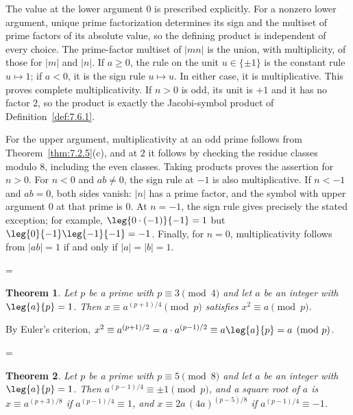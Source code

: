 \documentclass[11pt]{article}
\makeatletter
\theoremstyle{ntstyle}
\newtheorem{theorem}{Theorem}[subsection]
\let\nt@closedisplay\]
\def\nt@guardedclose{\@ifnextchar\par{\nt@closeafterpar}{\@ifnextchar\end{\postdisplaypenalty\@M\nt@closedisplay}{\nt@closedisplay}}}
\def\nt@closeafterpar\par{\@ifnextchar\par{\nt@closeafterpar}{\@ifnextchar\end{\postdisplaypenalty\@M\nt@closedisplay\par}{\nt@closedisplay\par}}}
\renewenvironment{proof}[1][\proofname]{\par
  \pushQED{\qed}\normalfont\topsep\medskipamount\edef\nt@afterproof{\@endparpenalty=\the\@endparpenalty\relax}\@beginparpenalty\@M\@endparpenalty\@M\let\]\nt@guardedclose\trivlist\item[]\textit{#1\@addpunct{.}} \ignorespaces}{\ifvmode\addpenalty\@M\fi\popQED\nt@afterproof\endtrivlist\@endpefalse}
\makeatother
\begin{document}
\begin{proof} The value at the lower argument $0$ is prescribed
	explicitly. For a nonzero lower argument, unique prime factorization
	determines its sign and the multiset of prime factors of its absolute
	value, so the defining product is independent of every choice. The
	prime-factor multiset of $|mn|$ is the union, with multiplicity, of
	those for $|m|$ and $|n|$. If $a\ge0$, the rule on the unit
	$u\in\{\pm1\}$ is the constant rule $u\mapsto1$; if $a<0$, it is
	the sign rule $u\mapsto u$. In either case, it is multiplicative. This proves complete
	multiplicativity. If $n>0$ is odd, its unit is $+1$ and it has no factor
	$2$, so the product is exactly the Jacobi-symbol product of Definition~\ref{def:7.6.1}.

	For the upper argument, multiplicativity at an odd prime follows from
	Theorem~\ref{thm:7.2.5}(c), and at $2$ it follows by checking the
	residue classes modulo $8$, including the even classes. Taking products
	proves the assertion for $n>0$. For $n<0$ and $ab\ne0$, the sign rule
	at $-1$ is also multiplicative. If $n<-1$ and $ab=0$, both sides vanish:
	$|n|$ has a prime factor, and the symbol with upper argument $0$ at
	that prime is $0$. At $n=-1$, the sign rule gives precisely the stated
	exception; for example, $\leg{0\cdot(-1)}{-1}=1$ but
	$\leg{0}{-1}\leg{-1}{-1}=-1$. Finally, for $n=0$, multiplicativity
	follows from $|ab|=1$ if and only if $|a|=|b|=1$.

\end{proof}
\begin{theorem}\label{thm:7.6.5} Let $p$ be a prime with $p \equiv 3
		\pmod{4}$ and let $a$ be an integer with $\leg{a}{p} = 1$. Then $x
		\equiv a^{(p+1)/4} \pmod{p}$ satisfies $x^{2} \equiv a \pmod{p}$.

\end{theorem}

\begin{proof} By Euler's criterion, $x^2 \equiv a^{(p+1)/2} = a \cdot a^{(p-1)/2}
		\equiv a\leg{a}{p} = a \pmod{p}$.

\end{proof}
\begin{theorem}\label{thm:7.6.6} Let $p$ be a prime with $p \equiv 5
		\pmod{8}$ and let $a$ be an integer with $\leg{a}{p} = 1$. Then
	$a^{(p-1)/4} \equiv \pm 1 \pmod{p}$, and a square root of $a$ is $x \equiv
		a^{(p+3)/8}$ if $a^{(p-1)/4} \equiv 1$, and $x \equiv
		2a\,(4a)^{(p-5)/8}$ if $a^{(p-1)/4} \equiv -1$.

\end{theorem}
\end{document}
